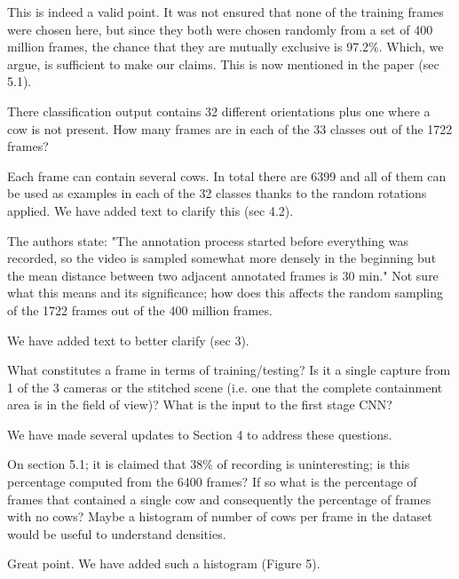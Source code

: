 \documentclass[10pt,a4paper]{letter}
\begin{document}
\begin{letter}{}
This is indeed a valid point. It was not ensured that none of the training frames were chosen here, but
since they both were chosen randomly from a set of 400 million frames, the
chance that they are mutually exclusive is 97.2\%. Which, we argue, is sufficient to make our claims. 
This is now mentioned in the paper (sec 5.1).

\begin{siderules}
There classification output contains 32 different orientations plus one where a cow is not present. How many frames are in each of the 33 classes 
out of the 1722 frames?
\end{siderules}

Each frame can contain several cows. In total there are 6399 and all of them
can be used as examples in each of the 32 classes thanks to the random
rotations applied. We have added text to clarify this (sec 4.2).

\begin{siderules}
The authors state: "The annotation process started before everything was recorded, so the video is sampled somewhat more densely in the beginning but 
the mean distance between two adjacent annotated frames is 30 min." Not sure what this means and its significance; how does this affects the random 
sampling of the 1722 frames out of the 400 million frames.
\end{siderules}

We have added text to better clarify (sec 3).

\begin{siderules}
What constitutes a frame in terms of training/testing? Is it a single capture from 1 of the 3 cameras or the stitched scene (i.e. one that the complete 
containment area is in the field of view)? What is the input to the first stage CNN?
\end{siderules}

We have made several updates to Section 4 to address these questions.

\begin{siderules}
On section 5.1; it is claimed that 38\% of recording is uninteresting; is this percentage computed from the 6400 frames? If so what is the percentage of 
frames that contained a single cow and consequently the percentage of frames with no cows? Maybe a histogram of number of cows per frame in the dataset 
would be useful to understand densities. 
\end{siderules}

Great point. We have added such a histogram (Figure 5).


\end{letter}
\end{document}
